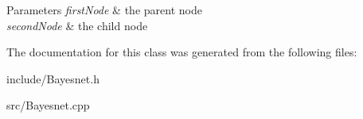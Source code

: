 \begin{DoxyParams}{Parameters}
{\em first\-Node} & the parent node \\
\hline
{\em second\-Node} & the child node \\
\hline
\end{DoxyParams}


The documentation for this class was generated from the following files\-:\begin{DoxyCompactItemize}
\item 
include/Bayesnet.\-h\item 
src/Bayesnet.\-cpp\end{DoxyCompactItemize}
